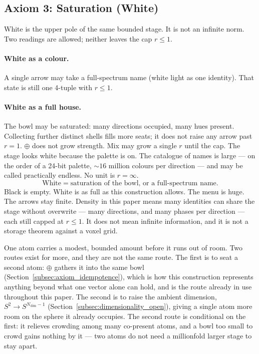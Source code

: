 \documentclass[12pt, a4paper]{article}
\begin{document}
\subsection{Axiom 3: Saturation (White)}
\label{subsec:axiom_white}
White is the upper pole of the same bounded stage. It is not an infinite
norm. Two readings are allowed; neither leaves the cap $r\le 1$.

\paragraph{White as a colour.}
A single arrow may take a full-spectrum name (white light as one
identity). That state is still one 4-tuple with $r\le 1$.

\paragraph{White as a full house.}
The bowl may be saturated: many directions occupied, many hues present.
Collecting further distinct shells fills more seats; it does not raise
any arrow past $r=1$. $\oplus$ does not grow strength. Mix may grow a
single $r$ until the cap. The stage looks white because the palette is on. The catalogue
of names is large --- on the order of a 24-bit palette,
$\sim 16$ million colours per direction --- and may be called
practically endless. No unit is $r=\infty$.
\begin{equation}
    \text{White} \;=\; \text{saturation of the bowl, or a full-spectrum name.}
    \label{eq:white_state}
\end{equation}
Black is empty. White is as full as this construction allows. The
menu is huge. The arrows stay finite.
Density in this paper means many identities can share the stage
without overwrite --- many directions, and many phases per direction
--- each still capped at $r\le 1$. It does not mean infinite
information, and it is not a storage theorem against a voxel grid.

One atom carries a modest, bounded amount before it runs out of room.
Two routes exist for more, and they are not the same route. The first
is to seat a second atom: $\oplus$ gathers it into the same bowl
(Section~\ref{subsec:axiom_idempotence}), which is how this
construction represents anything beyond what one vector alone can
hold, and is the route already in use throughout this paper. The
second is to raise the ambient dimension, $S^2\to S^{N_{\mathrm{dim}}-1}$
(Section~\ref{subsec:dimensionality_open}), giving a single atom more room
on the sphere it already occupies. The second route is conditional on
the first: it relieves crowding among many co-present atoms, and a
bowl too small to crowd gains nothing by it --- two atoms do not
need a millionfold larger stage to stay apart.
\end{document}
